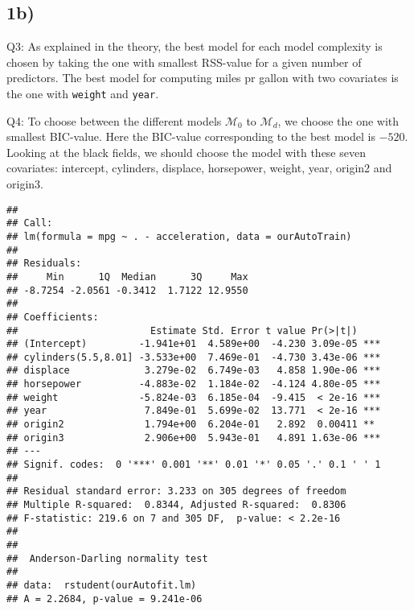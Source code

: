 \documentclass[]{article}
\newenvironment{Shaded}{\begin{snugshade}}{\end{snugshade}}
\newcommand{\KeywordTok}[1]{\textcolor[rgb]{0.13,0.29,0.53}{\textbf{#1}}}
\newcommand{\DataTypeTok}[1]{\textcolor[rgb]{0.13,0.29,0.53}{#1}}
\newcommand{\DecValTok}[1]{\textcolor[rgb]{0.00,0.00,0.81}{#1}}
\newcommand{\CommentTok}[1]{\textcolor[rgb]{0.56,0.35,0.01}{\textit{#1}}}
\newcommand{\OperatorTok}[1]{\textcolor[rgb]{0.81,0.36,0.00}{\textbf{#1}}}
\newcommand{\NormalTok}[1]{#1}
\begin{document}
\subsection{1b)}\label{b}

Q3: As explained in the theory, the best model for each model complexity
is chosen by taking the one with smallest RSS-value for a given number
of predictors. The best model for computing miles pr gallon with two
covariates is the one with \texttt{weight} and \texttt{year}.

Q4: To choose between the different models \(\mathcal{M}_0\) to
\(\mathcal{M}_d\), we choose the one with smallest BIC-value. Here the
BIC-value corresponding to the best model is \(-520\). Looking at the
black fields, we should choose the model with these seven covariates:
intercept, cylinders, displace, horsepower, weight, year, origin2 and
origin3.

\begin{Shaded}
\end{Shaded}

\begin{verbatim}
## 
## Call:
## lm(formula = mpg ~ . - acceleration, data = ourAutoTrain)
## 
## Residuals:
##     Min      1Q  Median      3Q     Max 
## -8.7254 -2.0561 -0.3412  1.7122 12.9550 
## 
## Coefficients:
##                       Estimate Std. Error t value Pr(>|t|)    
## (Intercept)         -1.941e+01  4.589e+00  -4.230 3.09e-05 ***
## cylinders(5.5,8.01] -3.533e+00  7.469e-01  -4.730 3.43e-06 ***
## displace             3.279e-02  6.749e-03   4.858 1.90e-06 ***
## horsepower          -4.883e-02  1.184e-02  -4.124 4.80e-05 ***
## weight              -5.824e-03  6.185e-04  -9.415  < 2e-16 ***
## year                 7.849e-01  5.699e-02  13.771  < 2e-16 ***
## origin2              1.794e+00  6.204e-01   2.892  0.00411 ** 
## origin3              2.906e+00  5.943e-01   4.891 1.63e-06 ***
## ---
## Signif. codes:  0 '***' 0.001 '**' 0.01 '*' 0.05 '.' 0.1 ' ' 1
## 
## Residual standard error: 3.233 on 305 degrees of freedom
## Multiple R-squared:  0.8344, Adjusted R-squared:  0.8306 
## F-statistic: 219.6 on 7 and 305 DF,  p-value: < 2.2e-16
## 
## 
##  Anderson-Darling normality test
## 
## data:  rstudent(ourAutofit.lm)
## A = 2.2684, p-value = 9.241e-06
\end{verbatim}
\end{document}
